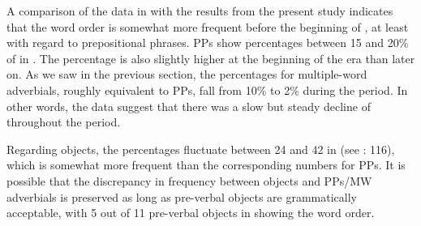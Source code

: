 \documentclass[output=paper, colorlinks, citecolor=brown]{langscibook}
\begin{document}
A comparison of the data in \citet{Sangfelt2019} with the results from the present study indicates that the  word order is somewhat more frequent before the beginning of , at least with regard to prepositional phrases. PPs show percentages between 15 and 20\% of  in  \citep[119]{Sangfelt2019}. The percentage is also slightly higher at the beginning of the era than later on. As we saw in the previous section, the percentages for multiple-word adverbials, roughly equivalent to PPs, fall from 10\% to 2\% during the  period. In other words, the data suggest that there was a slow but steady decline of  throughout the  period.



Regarding objects, the percentages fluctuate between 24 and 42 in  (see \citealt{Sangfelt2019}: 116), which is somewhat more frequent than the corresponding numbers for PPs. It is possible that the discrepancy in frequency between objects and PPs/MW adverbials is preserved as long as pre-verbal objects are grammatically acceptable, with 5 out of 11 pre-verbal objects in  showing the  word order.
\end{document}
